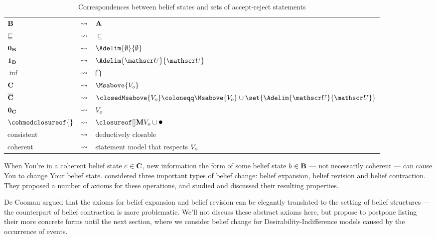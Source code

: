 \documentclass[preprint]{isipta2025}
\begin{document}
\begin{table}[ht]
\begin{tabular}{lcl}
\(\mathbf{B}\)
&\(\rightsquigarrow\)
&\(\mathbf{A}\)\\
\(\sqsubseteq\)
&\(\rightsquigarrow\)
&\(\subseteq\)\\
\(\mathbf{0}_{\mathbf{B}}\)
&\(\rightsquigarrow\)
&\(\Adelim{\emptyset}{\emptyset}\)\\
\(\mathbf{1}_{\mathbf{B}}\)
&\(\rightsquigarrow\)
&\(\Adelim{\opts}{\opts}\)\\
\(\inf\)
&\(\rightsquigarrow\)
&\(\bigcap\)\\
\(\mathbf{C}\)
&\(\rightsquigarrow\)
&\(\Msabove{\zeroM}\)\\
\(\overline{\mathbf{C}}\)
&\(\rightsquigarrow\)
&\(\closedMsabove{\zeroM}\coloneqq\Msabove{\zeroM}\cup\set{\Adelim{\opts}{\opts}}\)\\
\(\mathbf{0}_{\mathbf{C}}\)
&\(\rightsquigarrow\)
&\({V_o}\)\\
\(\cohmodclosureof{}\)
&\(\rightsquigarrow\)
&\(\Mclsof{\zeroM\union\bolleke}\)\\
consistent
&\(\rightsquigarrow\)
&deductively closable\\
coherent
&\(\rightsquigarrow\)
&statement model that respects \({V_o}\)
\end{tabular}
\caption{Correspondences between belief states and sets of accept-reject statements}
\label{table:correspondences}
\end{table}

When You're in a coherent belief state \(c_{}\in\mathbf{C}\), new information the form of some belief state \(b_{}\in\mathbf{B}\) --- not necessarily coherent --- can cause You to change Your belief state.
\citeauthor{alchourron1985} \cite{alchourron1985} considered three important types of belief change: belief expansion, belief revision and belief contraction.
They proposed a number of axioms for these operations, and studied and discussed their resulting properties.

De Cooman \cite{cooman2003a} argued that the axioms for belief expansion and belief revision can be elegantly translated to the setting of belief structures --- the counterpart of belief contraction is more problematic.
We'll not discuss these abstract axioms here, but propose to postpone listing their more concrete forms until the next section, where we consider belief change for Desirability-Indifference models caused by the occurrence of events.
\end{document}
